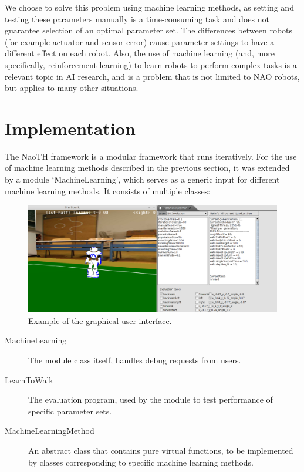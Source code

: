 \documentclass{article}
\begin{document}
We choose to solve this problem using machine learning methods, as setting and testing these parameters manually is a time-consuming task and does not guarantee selection of an optimal parameter set. The differences between robots (for example actuator and sensor error) cause parameter settings to have a different effect on each robot. Also, the use of machine learning (and, more specifically, reinforcement learning) to learn robots to perform complex tasks is a relevant topic in AI research, and is a problem that is not limited to NAO robots, but applies to many other situations. 


\section{Implementation}
The NaoTH framework is a modular framework that runs iteratively.  For the use of machine learning methods described in the previous section, it was extended by a module `MachineLearning', which serves as a generic input for different machine learning methods. It consists of multiple classes:

\begin{figure}
	\center
	\includegraphics[width=\textwidth]{images/GUI}
	\caption{Example of the graphical user interface.}
	\label{fig:avg}
\end{figure}

\begin{description}
\item[MachineLearning] The module class itself, handles debug requests from users.
\item[LearnToWalk] The evaluation program, used by the module to test performance of specific parameter sets.
\item[MachineLearningMethod] An abstract class that contains pure virtual functions, to be implemented by classes corresponding to specific machine learning methods.
\end{description}
\end{document}
